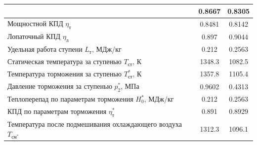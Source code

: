 \documentclass[a4paper,12pt]{article}
\begin{document}
\begin{longtable}{
    |p{8cm}|
%    
    c|
%    
    c|
%    
    }
%        
        & 0.8667
%        
        & 0.8305
%        
        \\ \hline
        Мощностной КПД $\eta_т$
%        
        & 0.8481
%        
        & 0.8142
%        
        \\ \hline
        Лопаточный КПД $\eta_л$
%        
        & 0.897
%        
        & 0.9044
%        
        \\ \hline
        Удельная работа ступени $L_т$, МДж/кг
%        
        & 0.212
%        
        & 0.2563
%        
        \\ \hline
        Статическая температура за ступенью $T_{ст}$, К
%        
        & 1348.3
%        
        & 1082.5
%        
        \\ \hline
        Температура торможения за ступенью $T_{ст}^*$, К
%        
        & 1357.8
%        
        & 1105.4
%        
        \\ \hline
        Давление торможения за ступенью $p_2^*$, МПа
%        
        & 0.9602
%        
        & 0.4313
%        
        \\ \hline
        Теплоперепад по параметрам торможения $H_0^*$, МДж/кг
%        
        & 0.212
%        
        & 0.2563
%        
        \\ \hline
        КПД по параметрам торможения $\eta_т^*$
%        
        & 0.891
%        
        & 0.8929
%        
        \\ \hline
        Температура после подмешивания охлаждающего воздуха $T_{см^*}$
%        
        & 1312.3
%        
        & 1096.1
%        
        \\ \hline
    \end{longtable}
    
\end{document}
